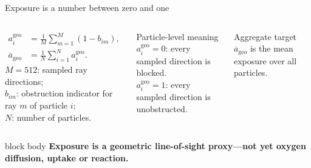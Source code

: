 \documentclass[aspectratio=169,11pt]{beamer}
\newcommand{\takeaway}[1]{%
	\begin{beamercolorbox}[rounded=true,sep=.55em]{block body}
		\centering\color{tumdark}\textbf{#1}
\end{beamercolorbox}}
\begin{document}
\begin{frame}{Exposure is a number between zero and one}
  \begin{columns}[c,onlytextwidth]
      \begin{align*}
        a_i^{\mathrm{geo}}
          &=\frac{1}{M}\sum_{m=1}^{M}(1-b_{im}),\\[.45em]
        \overline a_{\mathrm{geo}}
          &=\frac{1}{N}\sum_{i=1}^{N}a_i^{\mathrm{geo}}.
      \end{align*}
      \small
      $M=512$: sampled ray directions;\\
      $b_{im}$: obstruction indicator for ray $m$ of particle $i$;\\
      $N$: number of particles.
      \begin{block}{Particle-level meaning}
        $a_i^{\mathrm{geo}}=0$: every sampled direction is blocked.\\[.4em]
        $a_i^{\mathrm{geo}}=1$: every sampled direction is unobstructed.
      \end{block}
      \vspace{.3cm}
      \begin{block}{Aggregate target}
        $\overline a_{\mathrm{geo}}$ is the mean exposure over all particles.
      \end{block}
  \end{columns}
  \vspace{.2cm}
  \takeaway{Exposure is a geometric line-of-sight proxy---not yet oxygen diffusion, uptake or reaction.}
\end{frame}
\end{document}

